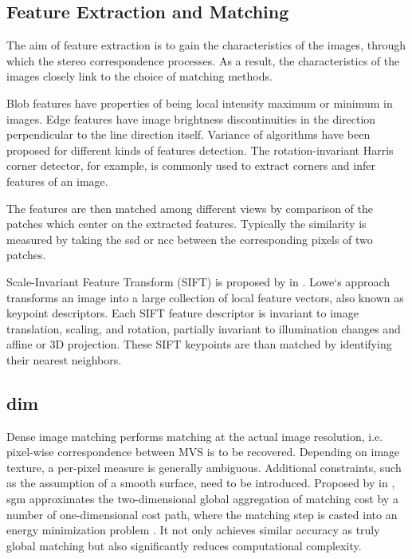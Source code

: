 \subsection{Feature Extraction and Matching}
The aim of feature extraction is to gain the characteristics of the images, through which the stereo correspondence processes. As a result, the characteristics of the images closely link to the choice of matching methods. \cite{wiki3dreconstruction}

Blob features have properties of being local intensity maximum or minimum in images. Edge features have image brightness discontinuities in the direction perpendicular to the line direction itself. Variance of algorithms have been proposed for different kinds of features detection. The rotation-invariant Harris corner detector, for example, is commonly used to extract corners and infer features of an image. 

The features are then matched among different views by comparison of the patches which center on the extracted features. Typically the similarity is measured by taking the \gls{ssd} or \gls{ncc} between the corresponding pixels of two patches.%

Scale-Invariant Feature Transform (SIFT) is proposed by \citeauthor{LoweSep1999} in \citeyear{LoweSep1999} \cite{LoweSep1999}. Lowe‘s approach transforms an image into a large collection of local feature vectors, also known as keypoint descriptors. Each SIFT feature descriptor is invariant to image translation, scaling, and rotation, partially invariant to illumination changes and affine or 3D projection. These SIFT keypoints are than matched by identifying their nearest neighbors.


\subsection{\gls{dim}}
Dense image matching performs matching at the actual image resolution, i.e. pixel-wise correspondence between MVS is to be recovered. Depending on image texture, a per-pixel measure is generally ambiguous. Additional constraints, such as the assumption of a smooth surface, need to be introduced. Proposed by \citeauthor{Hirschmueller2008} in \citeyear{Hirschmueller2008}, \gls{sgm} approximates the two-dimensional global aggregation of matching cost by a number of one-dimensional cost path, where the matching step is casted into an energy minimization problem \cite{Hirschmueller2008}. It not only achieves similar accuracy as truly global matching but also significantly reduces computational complexity.

